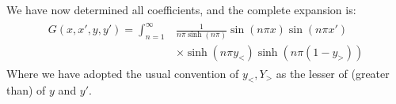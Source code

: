 \documentclass[a4paper,11pt]{article}
\numberwithin{equation}{section}
\newcommand{\lrp}[1]{\left({#1}\right)}
\begin{document}
We have now determined all coefficients, and the complete expansion is:
\begin{align}
\begin{split}
 G(x,x',y,y') = \int_{n=1}^\infty &\frac{1}{n\pi\sinh{(n\pi)}}\sin{(n\pi x)}\sin{(n\pi x')}\\
				  &\times\sinh{(n\pi y_<)}\sinh{\lrp{n\pi (1-y_>)}}
 \end{split}
\end{align}
Where we have adopted the usual convention of $y_<,Y_>$ as the lesser of (greater than) of $y$ and $y'$.
\end{document}
